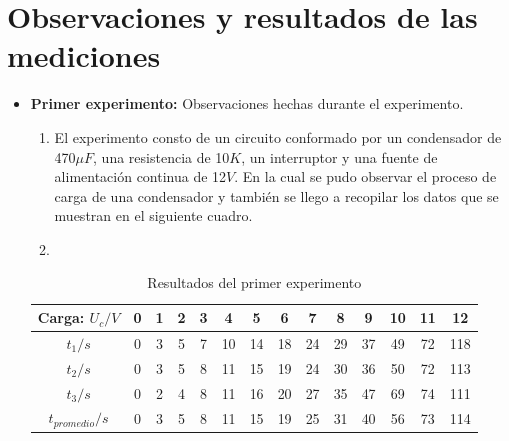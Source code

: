 \section{Observaciones y resultados de las mediciones}
\begin{itemize}
	\item \textbf{Primer experimento:} Observaciones hechas durante el experimento.
	\begin{enumerate}
		\item El experimento consto de un circuito conformado por un condensador de 470$\mu F$, una resistencia de 10$K$\textohm, un interruptor y una fuente de alimentación continua de 12$V$. En la cual se pudo observar el  proceso de carga de una condensador y también se llego a recopilar los datos que se muestran en el siguiente cuadro. 
		\item
	\end{enumerate}
	\begin{table}[h]
		\begin{center}
			\begin{tabular}{|c|c|c|c|c|c|c|c|c|c|c|c|c|c|}
				\hline
				Carga: $U_{c}/V$&0&1&2&3&4&5&6&7&8&9&10&11&12\\
				\hline
				$t_{1}/s$&0&3&5&7&10&14&18&24&29&37&49&72&118\\
				\hline
				$t_{2}/s$&0&3&5&8&11&15&19&24&30&36&50&72&113\\
				\hline
				$t_{3}/s$&0&2&4&8&11&16&20&27&35&47&69&74&111\\
				\hline
				\textbf{$t_{promedio}/s$}&0&3&5&8&11&15&19&25&31&40&56&73&114\\
				\hline
			\end{tabular}
		\caption{Resultados del primer experimento}
		\end{center}
	\end{table}
\end{itemize}
